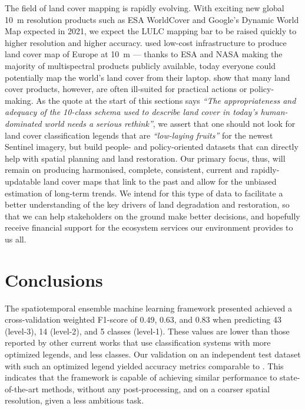 The field of land cover mapping is rapidly evolving. With exciting new global 10~m resolution products such as ESA WorldCover and Google's Dynamic World Map expected in 2021, we expect the LULC mapping bar to be raised quickly to higher resolution and higher accuracy. \citet{venter2021continentalscale} used low-cost infrastructure to produce land cover map of Europe at 10~m --- thanks to ESA and NASA making the majority of multispectral products publicly available, today everyone could potentially map the world's land cover from their laptop. \citet{szantoi2020addressing} show that many land cover products, however, are often ill-suited for practical actions or policy-making. As the quote at the start of this sections says \emph{``The appropriateness and adequacy of the 10-class schema used to describe land cover in today's human-dominated world needs a serious rethink''}, we assert that one should not look for land cover classification legends that are \emph{``low-laying fruits''} for the newest Sentinel imagery, but build people- and policy-oriented datasets that can directly help with spatial planning and land restoration. Our primary focus, thus, will remain on producing harmonised, complete, consistent, current and rapidly-updatable land cover maps that link to the past and allow for the unbiased estimation of long-term trends. We intend for this type of data to facilitate a better understanding of the key drivers of land degradation and restoration, so that we can help stakeholders on the ground make better decisions, and hopefully receive financial support for the ecosystem services our environment provides to us all.

\section{Conclusions} %

The spatiotemporal ensemble machine learning framework presented achieved a cross-validation weighted F1-score of 0.49, 0.63, and 0.83 when predicting 43 (level-3), 14 (level-2), and 5 classes (level-1). These values are lower than those reported by other current works that use classification systems with more optimized legends, and less classes. Our validation on an independent test dataset \citep{malinowski2020} with such an optimized legend yielded accuracy metrics comparable to  \citet{malinowski2020}. This indicates that the framework is capable of achieving similar performance to state-of-the-art methods, without any post-processing, and on a coarser spatial resolution, given a less ambitious task.

